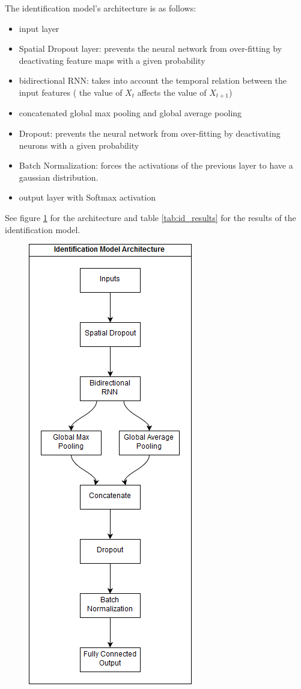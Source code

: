 \documentclass{article}
\begin{document}
The identification model's architecture is as follows:
\begin{itemize}
    \item input layer 
    \item Spatial Dropout layer: prevents the neural network from over-fitting by deactivating feature maps with a given probability
    \item bidirectional RNN: takes into account the temporal relation between the input features ( the value of $X_t$ affects the value of $X_{t+1}$)
    \item concatenated global max pooling and global average pooling
    \item Dropout:  prevents the neural network from over-fitting by deactivating neurons with a given probability
    \item Batch Normalization: forces the activations of the previous layer to have a gaussian distribution.
    \item output layer with Softmax activation
\end{itemize}
See figure \ref{fig:id_arch} for the architecture and table \ref{tab:id_results} for the results of the identification model.
\begin{figure}[H]
    \centering
    \includegraphics[scale=.65]{images/id_model.png}
    \caption{}
    \label{fig:id_arch}
\end{figure}
\end{document}
